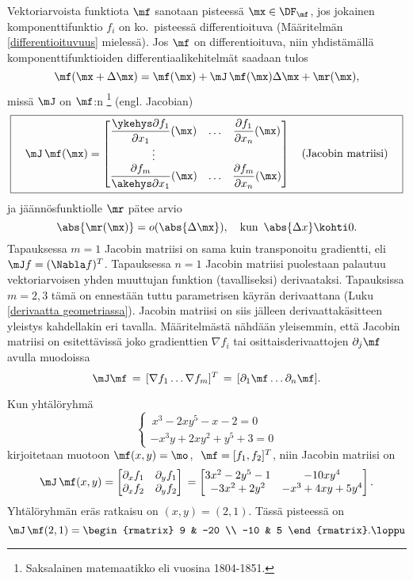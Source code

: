 %
Vektoriarvoista funktiota $\mf$ sanotaan  pisteessä $\mx\in\DF_\mf$,
jos jokainen komponenttifunktio $f_i$ on ko.\ pisteessä differentioituva (Määritelmän 
\ref{differentioituvuus} mielessä). Jos $\mf$ on differentioituva, niin yhdistämällä 
komponenttifunktioiden differentiaalikehitelmät saadaan tulos
\[
\mf(\mx+\Delta\mx)=\mf(\mx)+\mJ\,\mf(\mx)\Delta\mx+\mr(\mx),
\]
missä $\mJ$ on $\mf$:n \footnote[2]{Saksalainen matemaatikko   
eli vuosina 1804-1851. }  (engl. Jacobian)
\[
\boxed{\quad \mJ\,\mf(\mx)=\begin{bmatrix} 
                           \dfrac{\ykehys\partial f_1}{\partial x_1}(\mx) & \ldots & 
                           \dfrac{\partial f_1}{\partial x_n}(\mx) \\ \vdots \\ 
                           \dfrac{\partial f_m}{\akehys\partial x_1}(\mx) & \ldots & 
                           \dfrac{\partial f_m}{\partial x_n}(\mx)
                           \end{bmatrix}\quad \text{(Jacobin matriisi)} \quad}
\]
ja jäännösfunktiolle $\mr$ pätee arvio
\[
\abs{\mr(\mx)} = o(\abs{\Delta\mx}), \quad \text{kun}\,\ \abs{\Delta x} \kohti 0.
\]
Tapauksessa $m=1$ Jacobin matriisi on sama kuin transponoitu gradientti, eli
$\mJ f = (\Nabla f)^T$. Tapauksessa $n=1$ Jacobin matriisi puolestaan palautuu
vektoriarvoisen yhden muuttujan funktion (tavalliseksi) derivaataksi.
Tapauksissa $m=2,3$ tämä on ennestään tuttu parametrisen käyrän
derivaattana (Luku \ref{derivaatta geometriassa}). Jacobin matriisi on siis jälleen
derivaattakäsitteen yleistys kahdellakin eri tavalla. Määritelmästä nähdään yleisemmin, että
Jacobin matriisi on esitettävissä joko gradienttien $\nabla f_i$ tai osittaisderivaattojen
$\partial_j\mf$ avulla muodoissa
\[
\mJ\mf \,=\, [\nabla f_1 \ldots \nabla f_m]^T \,=\, [\partial_1\mf \ldots \partial_n\mf].
\]
\begin{Exa} \label{yryhmä-esim}
Kun yhtälöryhmä
\[ \begin{cases}
    \,x^3-2xy^5-x-2 = 0 \\
   -x^3y+2xy^2+y^5+3 = 0
   \end{cases} \]
kirjoitetaan muotoon $\mf(x,y)=\mo$, $\ \mf=[f_1,f_2]^T$, niin Jacobin matriisi on
\[
\mJ\,\mf(x,y) = \begin{bmatrix}
\partial_x f_1 & \partial_y f_1 \\
\partial_x f_2 & \partial_y f_2
\end{bmatrix} \\
= \begin{bmatrix}
3x^2-2y^5-1 & -10xy^4 \\ -3x^2+2y^2 & -x^3+4xy+5y^4
\end{bmatrix}.
\]
Yhtälöryhmän eräs ratkaisu on $(x,y)=(2,1)$. Tässä pisteessä on
\[
\mJ\,\mf(2,1)=\begin{rmatrix} 9 & -20 \\ -10 & 5 \end{rmatrix}. \loppu
\]
\end{Exa}

